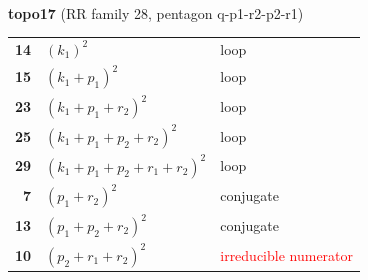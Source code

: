 \documentclass[10pt]{article}
\begin{document}
\begin{minipage}[t]{0.48\textwidth}
{}\\[2mm]\textbf{topo17} (RR family 28, pentagon q-p1-r2-p2-r1)\\[2pt]{\footnotesize\begin{tabular}{@{}r@{\ \ }l@{\ \ }l@{}}\textbf{14} & $(k_1)^2$ & loop\\
\textbf{15} & $(k_1+p_1)^2$ & loop\\
\textbf{23} & $(k_1+p_1+r_2)^2$ & loop\\
\textbf{25} & $(k_1+p_1+p_2+r_2)^2$ & loop\\
\textbf{29} & $(k_1+p_1+p_2+r_1+r_2)^2$ & loop\\
\textbf{7} & $(p_1+r_2)^2$ & conjugate\\
\textbf{13} & $(p_1+p_2+r_2)^2$ & conjugate\\
\textbf{10} & $(p_2+r_1+r_2)^2$ & \textcolor{red}{irreducible numerator}\\\end{tabular}}\end{minipage}\hfill%
\end{document}
